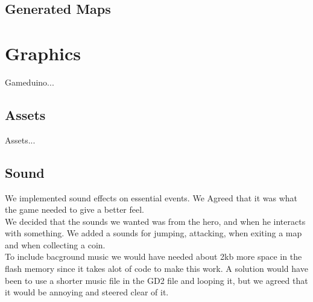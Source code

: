 \subsection{Generated Maps}

\section{Graphics}
Gameduino...

\subsection{Assets}
Assets...

\subsection{Sound} %

We implemented sound effects on essential events. We Agreed that it was what the game needed to give a better feel.\\
We decided that the sounds we wanted was from the hero, and when he interacts with something. We added a sounds for jumping, attacking, when exiting a map and when collecting a coin.\\
To include bacground music we would have needed about 2kb more space in the flash memory since it takes alot of code to make this work. A solution would have been to use a shorter music file in the GD2 file and looping it, but we agreed that it would be annoying and steered clear of it.

